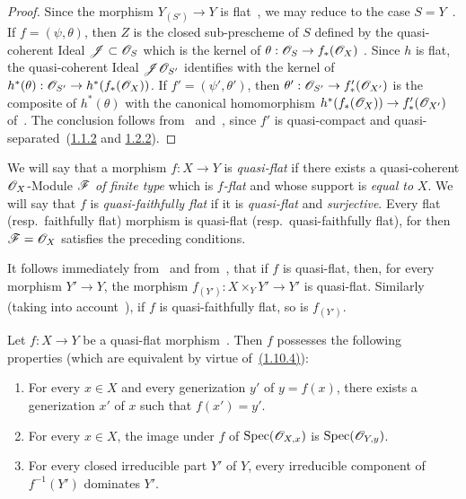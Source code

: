 \begin{proof}
Since the morphism $Y_{(S')}\to Y$ is flat~, we may reduce to the case $S=Y$~.
If $f=(\psi,\theta)$, then $Z$ is the closed sub-prescheme of $S$ defined by the quasi-coherent Ideal $\mathscr{J}\subset\mathscr{O}_S$ which is the kernel of $\theta:\mathscr{O}_S\to f_*(\mathscr{O}_X)$
.
Since $h$ is flat, the quasi-coherent Ideal $\mathscr{J}\mathscr{O}_{S'}$ identifies with the kernel of $h^*(\theta):\mathscr{O}_{S'}\to h^*(f_*(\mathscr{O}_X))$.
If $f'=(\psi',\theta')$, then $\theta':\mathscr{O}_{S'}\to f'_*(\mathscr{O}_{X'})$ is the composite of $h^*(\theta)$ with the canonical homomorphism $h^*(f_*(\mathscr{O}_X))\to f'_*(\mathscr{O}_{X'})$
of~.
The conclusion follows from~ and~, since $f'$ is quasi-compact and quasi-separated~({\hyperref[IV.1.1.2]{1.1.2}} and {\hyperref[IV.1.2.2]{1.2.2}}).
\end{proof}

\begin{env}[2.3.3]
\label{IV.2.3.3}
We will say that a morphism $f:X\to Y$ is \emph{quasi-flat} if there exists a quasi-coherent $\mathscr{O}_X$-Module $\mathscr{F}$ \emph{of finite type} which is \emph{$f$-flat} and whose support is \emph{equal to} $X$.
We will say that $f$ is \emph{quasi-faithfully flat} if it is \emph{quasi-flat} and \emph{surjective}.
Every flat (resp.\ faithfully flat) morphism is quasi-flat (resp.\ quasi-faithfully flat), for then $\mathscr{F}=\mathscr{O}_X$ satisfies the preceding conditions.
\end{env}

It follows immediately from~ and from~, that if $f$ is quasi-flat, then, for every morphism $Y'\to Y$, the morphism $f_{(Y')}:X\times_Y Y'\to Y'$ is quasi-flat.
Similarly (taking into account~), if $f$ is quasi-faithfully flat, so is $f_{(Y')}$.

\begin{proposition}[2.3.4]
\label{IV.2.3.4}
Let $f:X\to Y$ be a quasi-flat morphism~. Then $f$ possesses the following properties \textnormal{(}which are equivalent by virtue of~{\hyperref[IV.1.10.4]{(1.10.4)}}\textnormal{)}:
\begin{enumerate}
  \item[\textup{(i)}] For every $x\in X$ and every generization $y'$ of $y=f(x)$, there exists a generization $x'$ of $x$ such that $f(x')=y'$.
  \item[\textup{(ii)}] For every $x\in X$, the image under $f$ of $\operatorname{Spec}(\mathscr{O}_{X,x})$ is $\operatorname{Spec}(\mathscr{O}_{Y,y})$.
  \item[\emph{(iii)}] For every closed irreducible part $Y'$ of $Y$, every irreducible component of $f^{-1}(Y')$ dominates $Y'$.
\end{enumerate}
\end{proposition}

